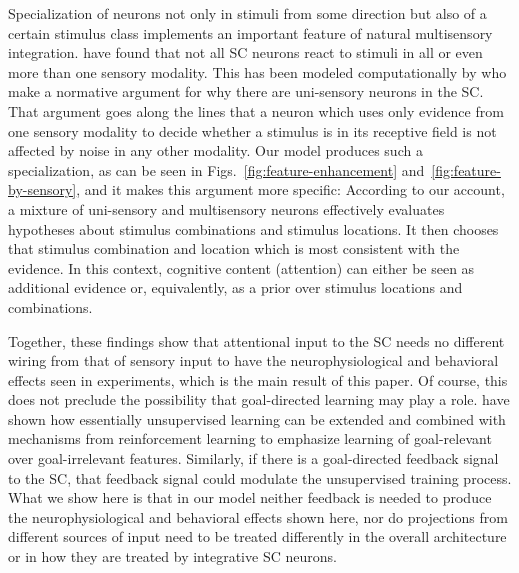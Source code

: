    Specialization of neurons not only in stimuli from some direction but also of a certain stimulus class implements an important feature of natural multisensory integration.
    \citet{wallace-and-stein-1996} have found that not all \ac{SC} neurons react to stimuli in all or even more than one sensory modality.
    This has been modeled computationally by \citet{colonius-and-diederich-2004} who make a normative argument for why there are uni-sensory neurons in the \ac{SC}.
    That argument goes along the lines that a neuron which uses only evidence from one sensory modality to decide whether a stimulus is in its receptive field is not affected by noise in any other modality.
    Our model produces such a specialization, as can be seen in Figs.~\ref{fig:feature-enhancement} and~\ref{fig:feature-by-sensory}, and it makes this argument more specific:
    According to our account, a mixture of uni-sensory and multisensory neurons effectively evaluates hypotheses about stimulus combinations and stimulus locations.
    It then chooses that stimulus combination and location which is most consistent with the evidence.
    In this context, cognitive content (attention) can either be seen as additional evidence or, equivalently, as a prior over stimulus locations and combinations.

    Together, these findings show that attentional input to the \ac{SC} needs no different wiring from that of sensory input to have the neurophysiological and behavioral effects seen in experiments, which is the main result of this paper.
    Of course, this does not preclude the possibility that goal-directed learning may play a role.
    \citet{weber-and-triesch-2009b} have shown how essentially unsupervised learning can be extended and combined with mechanisms from reinforcement learning to emphasize learning of goal-relevant over goal-irrelevant features.
    Similarly, if there is a goal-directed feedback signal to the \ac{SC}, that feedback signal could modulate the unsupervised training process.
    What we show here is that in our model neither feedback is needed to produce the neurophysiological and behavioral effects shown here, nor do projections from different sources of input need to be treated differently in the overall architecture or in how they are treated by integrative \ac{SC} neurons.

